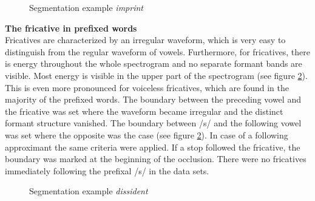 \begin{figure}[h!]
	\centering
	\caption{Segmentation example \textit{imprint}}
	\label{fig:segmentation imprint}
\end{figure}


\textbf{The fricative in prefixed words}\\




Fricatives are characterized by an irregular waveform, which is very easy to distinguish from the regular waveform of vowels. Furthermore, for fricatives, there is energy throughout the whole spectrogram and no separate formant bands are visible. Most energy is visible in the upper part of the spectrogram (see figure \ref{fig:segmentation dissident}). This is even more pronounced for voiceless fricatives, which are found in the majority of the prefixed words.
The boundary between the preceding vowel and the fricative was set where the waveform became irregular and the distinct formant structure vanished. The boundary between /s/ and the following vowel was set where the opposite was the case (see figure \ref{fig:segmentation dissident}). In case of a following approximant the same criteria were applied. If a stop followed the fricative, the boundary was marked at the beginning of the occlusion. There were no fricatives immediately following the prefixal /s/ in the data sets.\\

\begin{figure} [H]
	\centering
	\caption{Segmentation example \textit{dissident}}
	\label{fig:segmentation dissident}
\end{figure}



